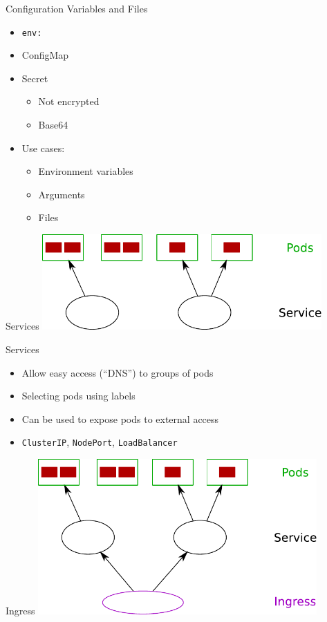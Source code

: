 \documentclass{dcpresentation}
\begin{document}
 \begin{frame}{Configuration Variables and Files}
   \begin{itemize}
    \item \texttt{env:}
    \item ConfigMap
    \item Secret
    \begin{itemize}
     \item Not encrypted
     \item Base64
    \end{itemize}
    \item Use cases:
    \begin{itemize}
     \item Environment variables
     \item Arguments
     \item Files
    \end{itemize}
   \end{itemize}
 
 \end{frame}
 
 \begin{frame}{Services}
  \centering
  \includegraphics[width=0.8\textwidth]{img/arch-ps.pdf}
 \end{frame}
 
 \begin{frame}{Services}
  \begin{itemize}
   \item Allow easy access (``DNS'') to groups of pods
   \item Selecting pods using labels
   \item Can be used to expose pods to external access
   \item \texttt{ClusterIP}, \texttt{NodePort}, \texttt{LoadBalancer}
  \end{itemize}
 \end{frame}


 \begin{frame}{Ingress}
  \centering
  \includegraphics[width=0.8\textwidth]{img/arch-psi.pdf}
 \end{frame}
 
\end{document}
